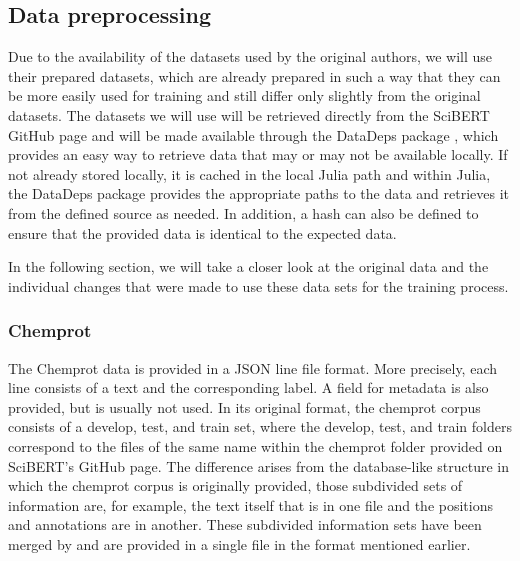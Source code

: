 \subsection{Data preprocessing}
Due to the availability of the datasets used by the original authors, we will use their prepared datasets, which are already prepared in such a way that they can be more easily used for training and still differ only slightly from the original datasets. The datasets we will use will be retrieved directly from the SciBERT GitHub page and will be made available through the DataDeps package \cite{White2019}, which provides an easy way to retrieve data that may or may not be available locally. If not already stored locally, it is cached in the local Julia path and within Julia, the DataDeps package provides the appropriate paths to the data and retrieves it from the defined source as needed. In addition, a hash can also be defined to ensure that the provided data is identical to the expected data.\cite{White2019} 

In the following section, we will take a closer look at the original data and the individual changes that were made to use these data sets for the training process. 

\subsubsection{Chemprot} 

The Chemprot data is provided in a JSON line file format. More precisely, each line consists of a text and the corresponding label. A field for metadata is also provided, but is usually not used. In its original format, the chemprot corpus consists of a develop, test, and train set, where the develop, test, and train folders correspond to the files of the same name within the chemprot folder provided on SciBERT's GitHub page. The difference arises from the database-like structure in which the chemprot corpus is originally provided, those subdivided sets of information are, for example, the text itself that is in one file and the positions and annotations are in another. These subdivided information sets have been merged by \citeauthor{Beltagy2019} and are provided in a single file in the format mentioned earlier. \cite{Beltagy2019,Wang2016} 


